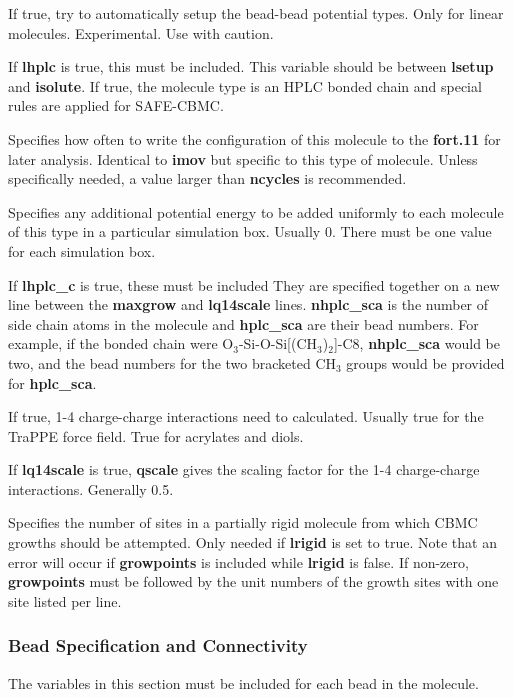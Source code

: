 \documentclass[12pt,letterpaper]{article}
\begin{document}
 If true, try to automatically setup the bead-bead
potential types.  Only for linear molecules.  Experimental.  Use with caution.

 If {\textbf{lhplc}} is true, this must be included. This variable
should be between {\textbf{lsetup}} and {\textbf{isolute}}. If true, the molecule type is an HPLC bonded chain
and special rules are applied for SAFE-CBMC.

 Specifies how often to write the configuration of this molecule 
to the {\textbf{fort.11}} for later analysis.
Identical to {\textbf{imov}} but specific to this type of molecule.
Unless specifically needed, a value larger than {\textbf {ncycles}} is recommended.

 Specifies any additional potential energy to be added 
uniformly to each molecule of this type in a particular simulation box.  Usually 0.
There must be one value for each simulation box.

 If {\textbf{lhplc\_c}} is true, these must be included
They are specified together on a new line between the {\textbf{maxgrow}} and {\textbf{lq14scale}} lines. 
{\textbf{nhplc\_sca}} is the number of side chain atoms in the molecule and {\textbf{hplc\_sca}} are their bead
numbers. For example, if the bonded chain were O$_{3}$-Si-O-Si[(CH$_{3}$)$_{2}$]-C8, 
{\textbf{nhplc\_sca}} would be two, and the bead numbers for the two bracketed CH$_{3}$ groups would
be provided for {\textbf{hplc\_sca}}.

 If true, 1-4 charge-charge interactions need to calculated. 
Usually true for the TraPPE force field.  True for acrylates and diols.

 If {\textbf{lq14scale}} is true, {\textbf{qscale}} gives the scaling factor
for the 1-4 charge-charge interactions.  Generally 0.5.

 Specifies the number of sites in a partially rigid molecule 
from which CBMC growths should be attempted.  
Only needed if {\textbf{lrigid}} is set to true. 
Note that an error will occur if {\textbf{growpoints}} is included while {\textbf{lrigid}} is false.
If non-zero, {\textbf{growpoints}} must be followed by the unit numbers
of the growth sites with one site listed per line.

\subsubsection{Bead Specification and Connectivity}
\label{beadspec}
The variables in this section must be included for each bead in the molecule.
\end{document}
